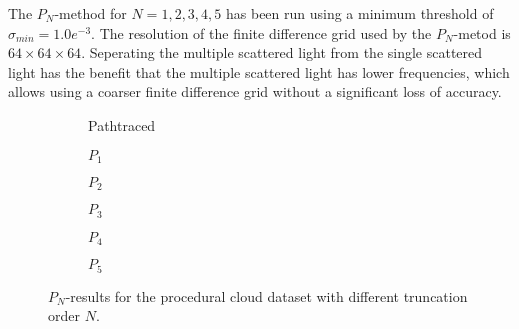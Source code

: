 The $P_N$-method for $N={1,2,3,4,5}$ has been run using a minimum threshold of $\sigma_{min}=1.0e^{-3}$. The resolution of the finite difference grid used by the $P_N$-metod is $64\times 64\times 64$. Seperating the multiple scattered light from the single scattered light has the benefit that the multiple scattered light has lower frequencies, which allows using a coarser finite difference grid without a significant loss of accuracy.
\begin{figure}[h]
\centering
\begin{subfigure}{0.49\columnwidth}
\caption{Pathtraced}
\label{fig:pn_results_nebulae1_pathtraced}
\end{subfigure}%
\hspace{0.01\columnwidth}
\begin{subfigure}{0.49\columnwidth}
\caption{$P_1$}
\label{fig:pn_results_nebulae1_P1}
\end{subfigure}%

\begin{subfigure}{0.49\columnwidth}
\caption{$P_2$}
\label{fig:pn_results_nebulae1_P2}
\end{subfigure}%
\hspace{0.01\columnwidth}
\begin{subfigure}{0.49\columnwidth}
\caption{$P_3$}
\label{fig:pn_results_nebulae1_P3}
\end{subfigure}%


\begin{subfigure}{0.49\columnwidth}
\caption{$P_4$}
\label{fig:pn_results_nebulae1_P4}
\end{subfigure}%
\hspace{0.01\columnwidth}
\begin{subfigure}{0.49\columnwidth}
\caption{$P_5$}
\label{fig:pn_results_nebulae1_P5}
\end{subfigure}%
\caption{$P_N$-results for the procedural cloud dataset with different truncation order $N$.}
\label{fig:pn_results_nebulae1}
\end{figure}

